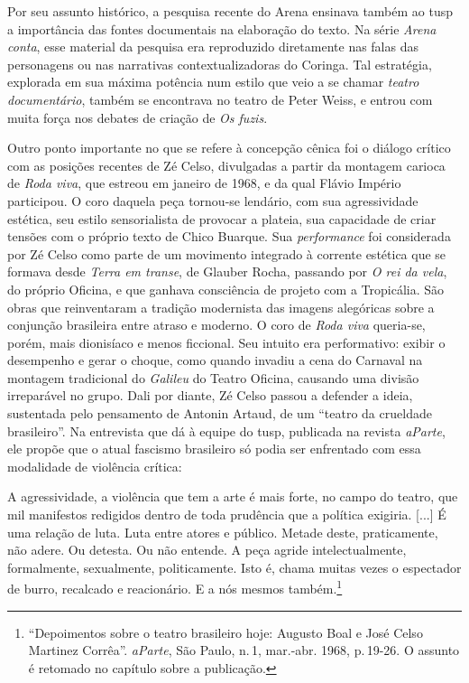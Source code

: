 Por seu assunto histórico, a pesquisa recente do Arena ensinava também
ao {\sc tusp} a importância das fontes documentais na elaboração do texto. Na
série {\it Arena conta}, esse material da pesquisa era reproduzido
diretamente nas falas das personagens ou nas narrativas
contextualizadoras do Coringa. Tal estratégia, explorada em sua máxima
potência num estilo que veio a se chamar {\it teatro documentário},
também se encontrava no teatro de Peter Weiss, e entrou com muita força
nos debates de criação de {\it Os fuzis}.

Outro ponto importante no que se refere à concepção cênica foi o diálogo
crítico com as posições recentes de Zé Celso, divulgadas a partir da
montagem carioca de {\it Roda viva}, que estreou em janeiro de 1968, e
da qual Flávio Império participou. O coro daquela peça tornou-se
lendário, com sua agressividade estética, seu estilo sensorialista de
provocar a plateia, sua capacidade de criar tensões com o próprio texto
de Chico Buarque. Sua {\it performance} foi considerada por Zé Celso
como parte de um movimento integrado à corrente estética que se formava
desde {\it Terra em transe}, de Glauber Rocha, passando por {\it O rei
da vela}, do próprio Oficina, e que ganhava consciência de projeto com a
Tropicália. São obras que reinventaram a tradição modernista das imagens
alegóricas sobre a conjunção brasileira entre atraso e moderno. O coro
de {\it Roda viva} queria-se, porém, mais dionisíaco e menos ficcional.
Seu intuito era performativo: exibir o desempenho e gerar o choque, como
quando invadiu a cena do Carnaval na montagem tradicional do
{\it Galileu} do Teatro Oficina, causando uma divisão irreparável no
grupo. Dali por diante, Zé Celso passou a defender a ideia, sustentada
pelo pensamento de Antonin Artaud, de um “teatro da crueldade
brasileiro”. Na entrevista que dá à equipe do {\sc tusp}, publicada na revista
{\it aParte}, ele propõe que o atual fascismo brasileiro só podia ser
enfrentado com essa modalidade de violência crítica:

\startblockquote
A agressividade, a violência que tem a arte é mais forte, no campo do
teatro, que mil manifestos redigidos dentro de toda prudência que a
política exigiria. {[}...{]} É uma relação de luta. Luta entre atores e
público. Metade deste, praticamente, não adere. Ou detesta. Ou não
entende. A peça agride intelectualmente, formalmente, sexualmente,
politicamente. Isto é, chama muitas vezes o espectador de burro,
recalcado e reacionário. E a nós mesmos também.\footnote{“Depoimentos
  sobre o teatro brasileiro hoje: Augusto Boal e José Celso Martinez
  Corrêa”. {\it aParte}, São Paulo, n.\,1, mar.-abr. 1968, p.\,19-26. O
  assunto é retomado no capítulo sobre a publicação.}
\stopblockquote

